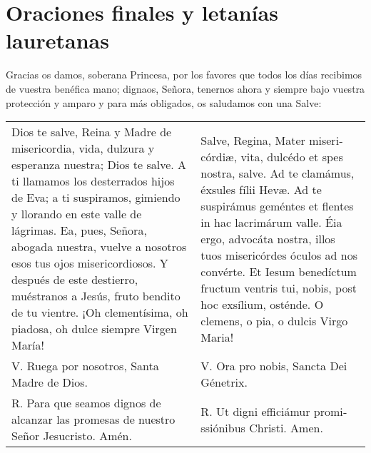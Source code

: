 \documentclass[./rosary.tex]{subfiles}
\begin{document}
\section*{Oraciones finales y letanías lauretanas}
\label{sec:final-prayer}

Gracias os damos, soberana Princesa, por los favores que todos los días recibimos de vuestra benéfica mano; dignaos, Señora, tenernos ahora
y siempre bajo vuestra protección y amparo y para más obligados, os saludamos con una Salve:

\label{hailMaryQueen}
\begin{longtable} { p{} p{} }
    Dios te salve, Reina y Madre de mi­se­ri­cordia, vida, dulzura y esperanza nuestra; Dios te salve.
    A ti llamamos los desterrados hijos de Eva; a ti suspiramos, gimiendo y llorando en este valle de lágrimas.
    Ea, pues, Señora, abogada nuestra, vuelve a nosotros esos tus ojos mi­se­ri­cordiosos. Y después de este destierro, muéstranos a Jesús,
    fruto bendito de tu vientre. ¡Oh cle­men­tísima, oh piadosa, oh dulce siempre Virgen María!

                                                                                          &

    Salve, Regina, Mater mi­se­ri­córdiæ, vita, dulcédo et spes nostra, salve. Ad te clamámus, éxsules fílii Hevæ.
    Ad te suspirámus geméntes et flentes in hac lacrimárum valle. Éia ergo, advocáta nostra, illos tuos mi­se­ri­córdes óculos ad nos convérte.
    Et Iesum benedíctum fructum ventris tui, nobis, post hoc exsílium, osténde. O clemens, o pia, o dulcis Virgo Maria!            \\

    V. Ruega por nosotros, Santa Madre de Dios.                                           & V. Ora pro nobis, Sancta Dei Génetrix. \\

    R. Para que seamos dignos de alcanzar las promesas de nuestro Señor Jesucristo. Amén. &
    R. Ut digni efficiámur pro­mi­ssiónibus Christi. Amen.
\end{longtable}
\end{document}
